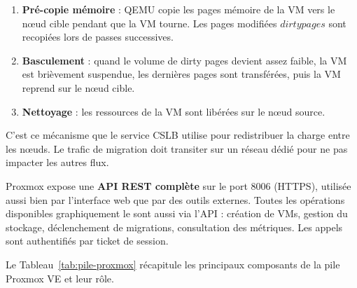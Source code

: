 \begin{enumerate}

    \item \textbf{Pré-copie mémoire} : QEMU copie les pages mémoire de la VM vers le n\oe{}ud cible pendant que la VM tourne. Les pages modifiées \(dirty pages\) sont recopiées lors de passes successives.

    \item \textbf{Basculement} : quand le volume de dirty pages devient assez faible, la VM est brièvement suspendue, les dernières pages sont transférées, puis la VM reprend sur le n\oe{}ud cible.

    \item \textbf{Nettoyage} : les ressources de la VM sont libérées sur le n\oe{}ud source.

\end{enumerate}

\par C'est ce mécanisme que le service CSLB utilise pour redistribuer la charge entre les n\oe{}uds. Le trafic de migration doit transiter sur un réseau dédié pour ne pas impacter les autres flux.\\


\par Proxmox expose une \textbf{API REST complète} sur le port 8006 (HTTPS), utilisée aussi bien par l'interface web que par des outils externes. Toutes les opérations disponibles graphiquement le sont aussi via l'API : création de VMs, gestion du stockage, déclenchement de migrations, consultation des métriques. Les appels sont authentifiés par ticket de session.\\


\par Le Tableau~\ref{tab:pile-proxmox} récapitule les principaux composants de la pile Proxmox VE et leur rôle.\\


